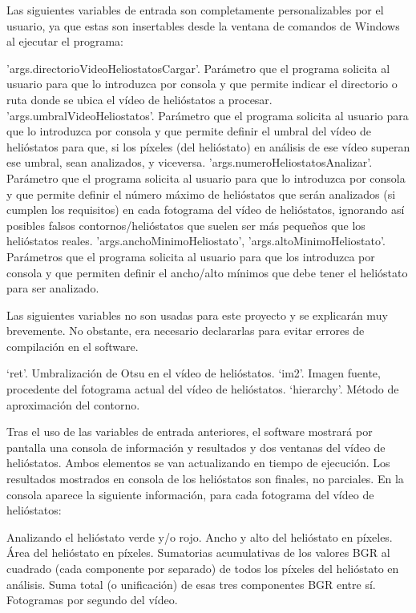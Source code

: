Las siguientes variables de entrada son completamente personalizables por el usuario, ya que estas son insertables desde la ventana de comandos de Windows al ejecutar el programa:

'args.directorioVideoHeliostatosCargar'. Parámetro que el programa solicita al usuario para que lo introduzca por consola y que permite indicar el directorio o ruta donde se ubica el vídeo de helióstatos a procesar.
'args.umbralVideoHeliostatos'. Parámetro que el programa solicita al usuario para que lo introduzca por consola y que permite definir el umbral del vídeo de helióstatos para que, si los píxeles (del helióstato) en análisis de ese vídeo superan ese umbral, sean analizados, y viceversa.
'args.numeroHeliostatosAnalizar'. Parámetro que el programa solicita al usuario para que lo introduzca por consola y que permite definir el número máximo de helióstatos que serán analizados (si cumplen los requisitos) en cada fotograma del vídeo de helióstatos, ignorando así posibles falsos contornos/helióstatos que suelen ser más pequeños que los helióstatos reales.
'args.anchoMinimoHeliostato', 'args.altoMinimoHeliostato'. Parámetros que el programa solicita al usuario para que los introduzca por consola y que permiten definir el ancho/alto mínimos que debe tener el helióstato para ser analizado.

Las siguientes variables no son usadas para este proyecto y se explicarán muy brevemente. No obstante, era necesario declararlas para evitar errores de compilación en el software.

‘ret’. Umbralización de Otsu en el vídeo de helióstatos.
‘im2’. Imagen fuente, procedente del fotograma actual del vídeo de helióstatos.
‘hierarchy’. Método de aproximación del contorno.

Tras el uso de las variables de entrada anteriores, el software mostrará por pantalla una consola de información y resultados y dos ventanas del vídeo de helióstatos. Ambos elementos se van actualizando en tiempo de ejecución. Los resultados mostrados en consola de los helióstatos son finales, no parciales. En la consola aparece la siguiente información, para cada fotograma del vídeo de helióstatos:

Analizando el helióstato verde y/o rojo.
Ancho y alto del helióstato en píxeles.
Área del helióstato en píxeles.
Sumatorias acumulativas de los valores BGR al cuadrado (cada componente por separado) de todos los píxeles del helióstato en análisis.
Suma total (o unificación) de esas tres componentes BGR entre sí.
Fotogramas por segundo del vídeo.

